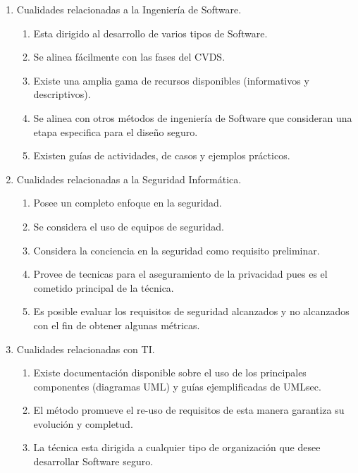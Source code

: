 \documentclass[runningheads,a4paper]{llncs}
\begin{document}
\begin{enumerate}
	\item Cualidades relacionadas a la Ingeniería de \gls{Software}.
		\begin{enumerate}
			\item Esta dirigido al desarrollo de varios tipos de \gls{Software}.
			\item Se alinea fácilmente con las fases del \gls{CVDS}.
			\item Existe una amplia gama de recursos disponibles (informativos y descriptivos).
			\item Se alinea con otros métodos de ingeniería de \gls{Software} que consideran una etapa especifica para el diseño seguro.
			\item Existen guías de actividades, de casos y ejemplos prácticos.\\
			
		\end{enumerate}
	\item Cualidades relacionadas a la Seguridad Informática.
		\begin{enumerate}
			\item Posee un completo enfoque en la seguridad.
			\item Se considera el uso de equipos de seguridad.
			\item Considera la conciencia en la seguridad como requisito preliminar.
			\item Provee de tecnicas para el aseguramiento de la privacidad pues es el cometido principal de la técnica.
			\item Es posible evaluar los requisitos de seguridad alcanzados y no alcanzados con el fin de obtener algunas métricas.\\

		\end{enumerate}
	\item Cualidades relacionadas con \gls{TI}.
		\begin{enumerate} 
			\item Existe documentación disponible sobre el uso de los principales componentes (diagramas UML) y guías ejemplificadas de \gls{UMLsec}.
			\item El método promueve el re-uso de requisitos de esta manera garantiza su evolución y completud.
			\item La técnica esta dirigida a cualquier tipo de organización que desee desarrollar \gls{Software} seguro.\\
		\end{enumerate}
\end{enumerate}
\end{document}
